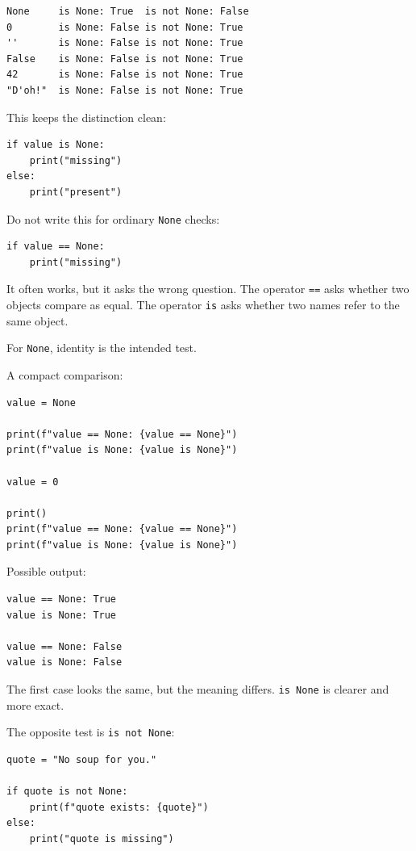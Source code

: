 \begin{verbatim}
None     is None: True  is not None: False
0        is None: False is not None: True 
''       is None: False is not None: True 
False    is None: False is not None: True 
42       is None: False is not None: True 
"D'oh!"  is None: False is not None: True 
\end{verbatim}

This keeps the distinction clean:

\begin{verbatim}
if value is None:
    print("missing")
else:
    print("present")
\end{verbatim}

Do not write this for ordinary \texttt{None} checks:

\begin{verbatim}
if value == None:
    print("missing")
\end{verbatim}

It often works, but it asks the wrong question. The operator \texttt{==} asks whether two objects compare as equal. The operator \texttt{is} asks whether two names refer to the same object.

For \texttt{None}, identity is the intended test.

A compact comparison:

\begin{verbatim}
value = None

print(f"value == None: {value == None}")
print(f"value is None: {value is None}")

value = 0

print()
print(f"value == None: {value == None}")
print(f"value is None: {value is None}")
\end{verbatim}

Possible output:

\begin{verbatim}
value == None: True
value is None: True

value == None: False
value is None: False
\end{verbatim}

The first case looks the same, but the meaning differs. \texttt{is None} is clearer and more exact.

The opposite test is \texttt{is not None}:

\begin{verbatim}
quote = "No soup for you."

if quote is not None:
    print(f"quote exists: {quote}")
else:
    print("quote is missing")
\end{verbatim}

